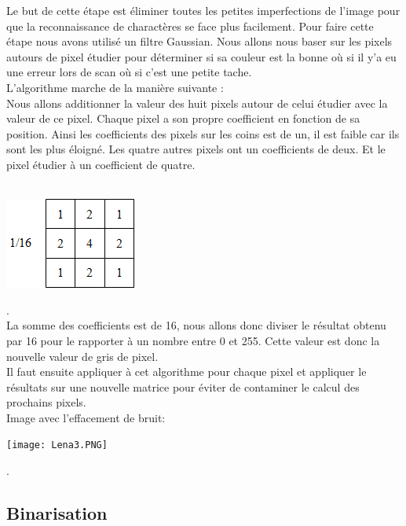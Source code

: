 \documentclass [french,12pt]{article}
\begin{document}
Le but de cette étape est éliminer toutes les petites imperfections de l’image pour que la reconnaissance de charactères se face plus facilement. Pour faire cette étape nous avons utilisé un filtre Gaussian. Nous allons nous baser sur les pixels autours de pixel étudier pour déterminer si sa couleur est la bonne où si il y’a eu une erreur lors de scan où si c’est une petite tache.\\
	L’algorithme marche de la manière suivante :\\
	Nous allons additionner la valeur des huit pixels autour de celui étudier avec la valeur de ce pixel. Chaque pixel a son propre coefficient en fonction de sa position. Ainsi les coefficients des pixels sur les coins est de un, il est faible car ils sont les plus éloigné. Les quatre autres pixels ont un coefficients de deux. Et le pixel étudier à un coefficient de quatre.\\
\\
\begin{center} \includegraphics[scale=0.7]{Inline2.png} \end{center}.
\\
La somme des coefficients est de 16, nous allons donc diviser le résultat obtenu par 16 pour le rapporter à un nombre entre 0 et 255. Cette valeur est donc la nouvelle valeur de gris de pixel.
\\
	Il faut ensuite appliquer à cet algorithme pour chaque pixel et appliquer le résultats sur une nouvelle matrice pour éviter de contaminer le calcul des prochains pixels.
\\
Image avec l'effacement de bruit:
\\
\begin{center} \texttt{[image: Lena3.PNG]} \end{center}.
\\

\subsection{Binarisation}
\end{document}
